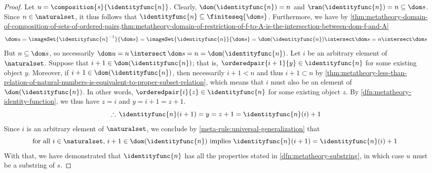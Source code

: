 \begin{proof}
    Let \( u = \composition{s}{ \identityfunc{n} } \).
    Clearly, \( \dom \mleft( \identityfunc{n} \mright) = n \) and \( \ran \mleft( \identityfunc{n} \mright) = n \subseteq \dom s \).
    Since \( n \in \naturalset \), it thus follows that \( \identityfunc{n} \subseteq \finiteseq{\dom s} \).
    Furthermore, we have by
    \cref{thm:metatheory-domain-of-composition-of-sets-of-ordered-pairs,thm:metatheory-domain-of-restriction-of-f-to-A-is-the-intersection-between-dom-f-and-A}
    \begin{equation*}
        \dom u = \imageSet{ \identityfunc{n}^{-1} }{\dom s} = \imageSet{ \identityfunc{n} }{\dom s} = \dom \mleft( \identityfunc{n} \mright) \intersect \dom s
               = n \intersect \dom s
    \end{equation*}
    But \( n \subseteq \dom s \), so necessarily \( \dom u = n \, {\intersect}\, \dom s = n = \dom \mleft( \identityfunc{n} \mright) \).
    Let \( i \) be an arbitrary element of \( \naturalset \).
    Suppose that \( i + 1 \in \dom \mleft( \identityfunc{n} \mright) \); that is, \( \orderedpair{i + 1}{y} \in \identityfunc{n} \) for some
    existing object \( y \).
    Moreover, if \( i + 1 \in \dom \mleft( \identityfunc{n} \mright) \), then necessarily \( i + 1 < n \) and thus \( i + 1 \subset n \)
    by \cref{thm:metatheory-less-than-relation-of-natural-numbers-is-equivalent-to-proper-subset-relation}, which means that
    \( i \) must also be an element of \( \dom \mleft( \identityfunc{n} \mright) \).
    In other words, \( \orderedpair{i}{z} \in \identityfunc{n} \) for some existing object \( z \).
    By \cref{dfn:metatheory-identity-function}, we thus have \( z = i \) and \( y = i + 1 = z + 1 \).
    \begin{equation*}
        \therefore \, \identityfunc{n}(i + 1) = y = z + 1 = \identityfunc{n}(i) + 1
    \end{equation*}
    Since \( i \) is an arbitrary element of \( \naturalset \), we conclude by \cref{meta-rule:universal-generalization} that
    \begin{equation*}
        \text{for all \( i \in \naturalset \), \( i + 1 \in \dom \mleft( \identityfunc{n} \mright) \) implies \( \identityfunc{n}(i + 1) = \identityfunc{n}(i) + 1 \) }
    \end{equation*}
    With that, we have demonstrated that \( \identityfunc{n} \) has all the properties stated in \cref{dfn:metatheory-substring}, in which case \( u \)
    must be a substring of \( s \).
\end{proof}


